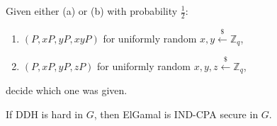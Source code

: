 \begin{definition}
    Given either (a) or (b) with probability \(\frac{1}{2}\):
    \begin{enumerate}
        \item[(a)] \((P, xP, yP, xyP)\) for uniformly random \(x, y \xleftarrow{\$} \mathbb{Z}_q\),
        \item[(b)] \((P, xP, yP, zP)\) for uniformly random \(x, y, z \xleftarrow{\$} \mathbb{Z}_q\),
    \end{enumerate}
    decide which one was given.
\end{definition}

\begin{theorem}
    If DDH is hard in \(G\), then ElGamal is IND-CPA secure in \(G\).
\end{theorem}

